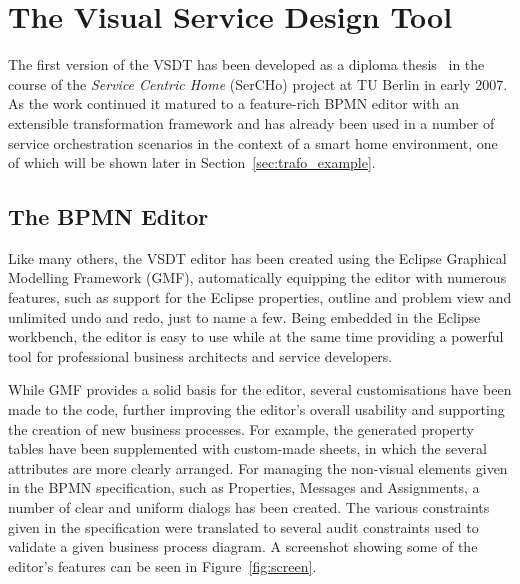 \section{The Visual Service Design Tool}
\label{sec:editor}

The first version of the VSDT has been developed as a diploma thesis~\cite{kuester2007development} in the course of the \emph{Service Centric Home} (SerCHo) project at TU Berlin in early 2007.  As the work continued it matured to a feature-rich BPMN editor with an extensible transformation framework and has already been used in a number of service orchestration scenarios in the context of a smart home environment, one of which will be shown later in Section~\ref{sec:trafo_example}.
%



\subsection{The BPMN Editor}
\label{sec:editor_editor}

Like many others, the VSDT editor has been created using the Eclipse Graphical Modelling Framework (GMF), automatically equipping the editor with numerous features, such as support for the Eclipse properties, outline and problem view and unlimited undo and redo, just to name a few.  Being embedded in the Eclipse workbench, the editor is easy to use while at the same time providing a powerful tool for professional business architects and service developers.

While GMF provides a solid basis for the editor, several customisations have been made to the code, further improving the editor's overall usability and supporting the creation of new business processes.  For example, the generated property tables have been supplemented with custom-made sheets, in which the several attributes are more clearly arranged.  For managing the non-visual elements given in the BPMN specification, such as Properties, Messages and Assignments, a number of clear and uniform dialogs has been created.  The various constraints given in the specification were translated to several audit constraints used to validate a given business process diagram.  A screenshot showing some of the editor's features can be seen in Figure~\ref{fig:screen}.

